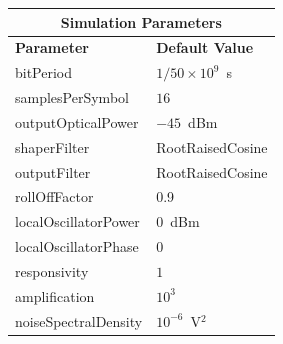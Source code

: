 \begin{table}[H]
	\centering
	\footnotesize
	\begin{tabular}{|l|l|}
		\hline
		\multicolumn{2}{|c|}{ \textbf{Simulation Parameters} } \\
		\hline
		\textbf{Parameter}     & \textbf{Default Value}                                     \\\hline
		bitPeriod              & $1/50\times10^9$~s														\\\hline
		samplesPerSymbol       & $16$                                                       \\\hline
		outputOpticalPower     & $-45$~dBm 													\\ \hline
		shaperFilter	       & RootRaisedCosine												\\ \hline
		outputFilter		   & RootRaisedCosine												\\ \hline
		rollOffFactor		   & 0.9														\\ \hline
		localOscillatorPower   & $0$~dBm                                                    \\ \hline
		localOscillatorPhase   & $0$                                                        \\ \hline
		responsivity           & $1$                                                        \\ \hline
		amplification          & $10^3$                                                     \\ \hline
		noiseSpectralDensity   & $10^{-6}$~V$^2$                             					\\ \hline
	\end{tabular}
\end{table}
